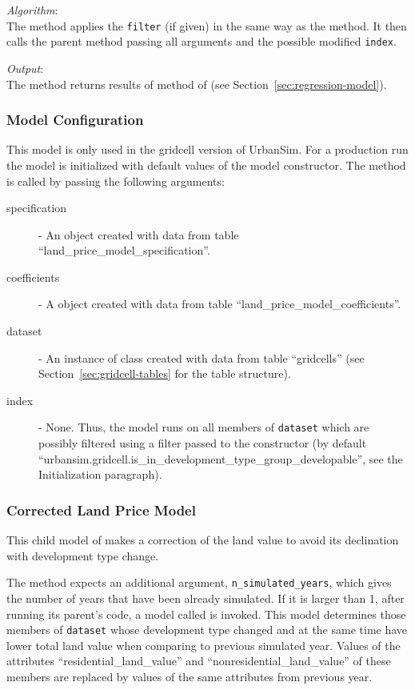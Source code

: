 {\it Algorithm}:\\[1mm]
The method applies the \verb|filter| (if given) in the same way as the
 method. It then calls the parent method 
passing all arguments and the possible modified \verb|index|.

{\it Output}:\\[1mm]
The method returns results of  method of
 (see Section~\ref{sec:regression-model}).

\subsubsection{Model Configuration}
%
This model is only used in the gridcell version of UrbanSim.
For a production run the model is
initialized with default values of the model 
constructor. The  method is called by passing the
following arguments:
\begin{description}
\item[specification] - An
 object created with data from table
``land_price_model_specification''. 
\item[coefficients] - A  object created
with data from table ``land_price_model_coefficients''.
\item[dataset] - An instance of class  created with data
  from table ``gridcells'' (see Section~\ref{sec:gridcell-tables} for the
  table structure).
\item[index] - None. Thus, the model runs on all members of \verb|dataset| which are possibly 
filtered using a filter passed to the constructor (by default ``urbansim.gridcell.is_in_development_type_group_developable'', see
the Initialization paragraph).
\end{description}

\subsubsection{Corrected Land Price Model}
%
This child model of   makes a
correction of the land value to avoid its declination with development type
change.

The  method expects an additional argument, \verb|n_simulated_years|,
which gives the number of years that have been already simulated. If it is larger than 1,
after running its parent's code, a model called  
is invoked. 
This model determines those members of \verb|dataset| whose
development type changed and at the same time have lower total land value when
comparing to previous simulated year. Values of the attributes 
``residential_land_value'' and ``nonresidential_land_value'' of these members
are replaced by values of the same attributes from previous year.

